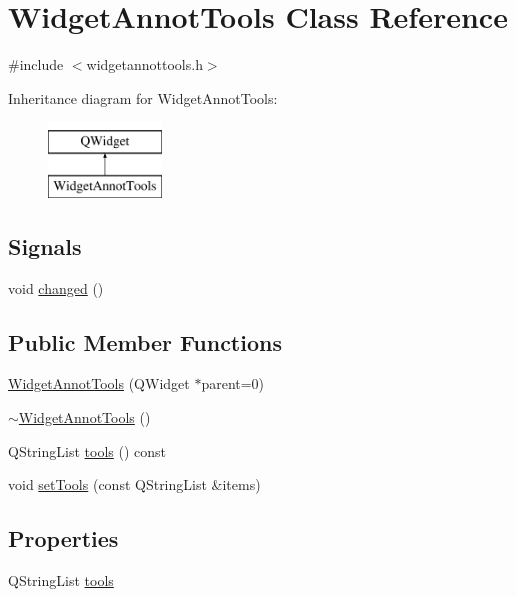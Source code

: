 \hypertarget{classWidgetAnnotTools}{\section{Widget\+Annot\+Tools Class Reference}
\label{classWidgetAnnotTools}
}


{\ttfamily \#include $<$widgetannottools.\+h$>$}

Inheritance diagram for Widget\+Annot\+Tools\+:\begin{figure}[H]
\begin{center}
\leavevmode
\includegraphics[height=2.000000cm]{classWidgetAnnotTools}
\end{center}
\end{figure}
\subsection*{Signals}
\begin{DoxyCompactItemize}
\item 
void \hyperlink{classWidgetAnnotTools_abfa81dfa80b0d36540138a8578039eff}{changed} ()
\end{DoxyCompactItemize}
\subsection*{Public Member Functions}
\begin{DoxyCompactItemize}
\item 
\hyperlink{classWidgetAnnotTools_abd8990f3bb40d4ad146891337027b9f7}{Widget\+Annot\+Tools} (Q\+Widget $\ast$parent=0)
\item 
\hyperlink{classWidgetAnnotTools_a330ab603462f22d814886c653d829073}{$\sim$\+Widget\+Annot\+Tools} ()
\item 
Q\+String\+List \hyperlink{classWidgetAnnotTools_a2ee1ae86c599bdfccbc58aa82b81a737}{tools} () const 
\item 
void \hyperlink{classWidgetAnnotTools_a3e2bbe5a082c091a244969405ac6279f}{set\+Tools} (const Q\+String\+List \&items)
\end{DoxyCompactItemize}
\subsection*{Properties}
\begin{DoxyCompactItemize}
\item 
Q\+String\+List \hyperlink{classWidgetAnnotTools_a2d2c86ec92a88a43e3ef804103c854fd}{tools}
\end{DoxyCompactItemize}



